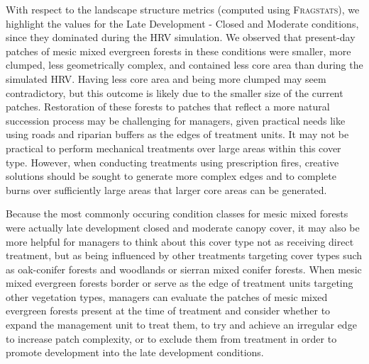 With respect to the landscape structure metrics (computed using \textsc{Fragstats}), we highlight the values for the Late Development - Closed and Moderate conditions, since they dominated during the HRV simulation. We observed that present-day patches of mesic mixed evergreen forests in these conditions were smaller, more clumped, less geometrically complex, and contained less core area than during the simulated HRV. Having less core area and being more clumped may seem contradictory, but this outcome is likely due to the smaller size of the current patches. Restoration of these forests to patches that reflect a more natural succession process may be challenging for managers, given practical needs like using roads and riparian buffers as the edges of treatment units. It may not be practical to perform mechanical treatments over large areas within this cover type. However, when conducting treatments using prescription fires, creative solutions should be sought to generate more complex edges and to complete burns over sufficiently large areas that larger core areas can be generated.

Because the most commonly occuring condition classes for mesic mixed forests were actually late development closed and moderate canopy cover, it may also be more helpful for managers to think about this cover type not as receiving direct treatment, but as being influenced by other treatments targeting cover types such as oak-conifer forests and woodlands or sierran mixed conifer forests. When mesic mixed evergreen forests border or serve as the edge of treatment units targeting other vegetation types, managers can evaluate the patches of mesic mixed evergreen forests present at the time of treatment and consider whether to expand the management unit to treat them, to try and achieve an irregular edge to increase patch complexity, or to exclude them from treatment in order to promote development into the late development conditions.                                                                                                                                                                                                                                                                                                                                                                                                                                                    













